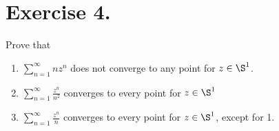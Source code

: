 \section*{Exercise 4.}

Prove that
\begin{enumerate}[label=(\alph*)]
    \item $\sum_{n = 1}^{\infty} n z^n$ does not converge to any point for $z\in \S^1$.
    \item $\sum_{n = 1}^\infty \frac{z^n}{n^2}$ converges to every point for $z \in\S^1$
    \item $\sum_{n = 1}^\infty \frac{z^n}{n}$ converges to every point for $z \in\S^1$, except for 1.
\end{enumerate}